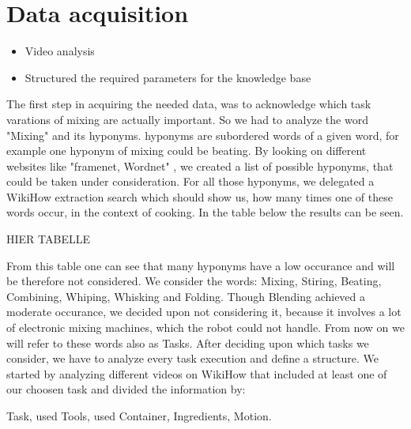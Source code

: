 \documentclass[	pdftex, 
								a4paper,
								11pt, DIV11, BCOR5mm,
								parskip,
								]{scrreprt}
\begin{document}
	\chapter*{Data acquisition}
	\begin{itemize}
		\item Video analysis
		\item Structured the required parameters for the knowledge base
	\end{itemize}
	The first step in acquiring the needed data, was to acknowledge which task varations of mixing are actually important. So we had to analyze the word "Mixing" and its hyponyms. 
	hyponyms are subordered words of a given word, for example one hyponym of mixing could be beating. By looking on different websites like "framenet, Wordnet" , we created a list of possible hyponyms, that could be taken under consideration.
	For all those hyponyms, we delegated a WikiHow extraction search which should show us, how many times one of these words occur, in the context of cooking.
	In the table below the results can be seen.
	
	HIER TABELLE

	From this table one can see that many hyponyms have a low occurance and will be therefore not considered.
	We consider the words: Mixing, Stiring, Beating, Combining, Whiping, Whisking and Folding. Though Blending achieved a moderate occurance, we decided upon not considering it, because it involves a lot of electronic mixing machines, which the robot could not handle.
	From now on we will refer to these words also as Tasks.
	After deciding upon which tasks we consider, we have to analyze every task execution and define a structure.
	We started by analyzing different videos on WikiHow that included at least one of our choosen task and divided the information by:
	
	Task, used Tools, used Container, Ingredients, Motion.
\end{document}
